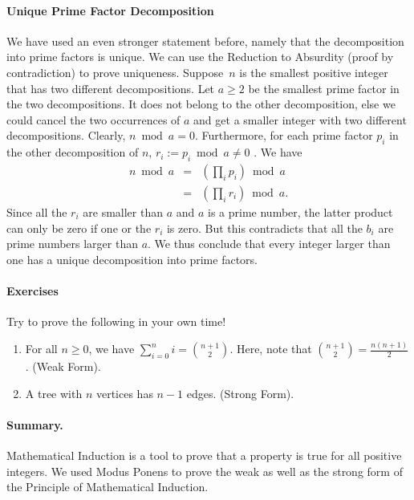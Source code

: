 \paragraph{Unique Prime Factor Decomposition}
We have used an even stronger statement before, namely that the
decomposition into prime factors is unique.
We can use the Reduction to Absurdity (proof by contradiction)
to prove uniqueness.
Suppose~$n$ is the smallest positive integer that has two
different decompositions.
Let $a \geq 2$ be the smallest prime factor in the two decompositions.
It does not belong to the other decomposition, else we could
cancel the two occurrences of $a$ and get a smaller integer
with two different decompositions.
Clearly, $n \bmod a = 0$.
Furthermore, for each
prime factor $p_i$ in the other decomposition of $n$,
$r_i := p_i \bmod a \neq 0$ .
We have
\begin{eqnarray*}
  n \bmod a  &=&  \left( \prod_i p_i \right) \bmod a             \\
             &=&  \left( \prod_i r_i \right) \bmod a.
\end{eqnarray*}
Since all the $r_i$ are smaller than $a$ and $a$ is a prime number,
the latter product can only be zero if one or the $r_i$ is zero.
But this contradicts that all the $b_i$ are prime numbers larger
than $a$.
We thus conclude that every integer larger than one has
a unique decomposition into prime factors.

\paragraph{Exercises}
Try to prove the following in your own time!
\begin{enumerate}
    \item For all $n \geq 0$, we have $\sum_{i=0}^n i = {n+1 \choose 2}$.
        Here, note that ${n+1 \choose 2} = \frac{n (n+1)}{2}$. (Weak Form).
    \item A tree with $n$ vertices has $n-1$ edges. (Strong Form).
\end{enumerate}

\paragraph{Summary.}
Mathematical Induction is a tool to prove that a property is true
for all positive integers.
We used Modus Ponens to prove the weak as well as the strong form
of the Principle of Mathematical Induction.
